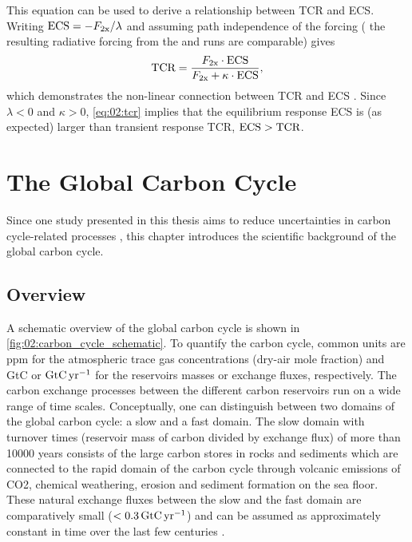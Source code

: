 This equation can be used to derive a relationship between \ac{TCR} and
\ac{ECS}. Writing $\mathtxt{ECS} = -F_\mathtxt{2x} / \lambda$ and assuming path
independence of the forcing (\ie{} the resulting radiative forcing from the
\onepctcotwo{} and  runs are comparable) gives
\begin{equation}
  \mathtxt{TCR} = \frac{F_\mathtxt{2x} \cdot \mathtxt{ECS}}{F_\mathtxt{2x} +
    \kappa \cdot \mathtxt{ECS}},
  \label{eq:02:tcr_vs_ecs}
\end{equation}
which demonstrates the non-linear connection between \ac{TCR} and \ac{ECS}
\autocite{Gregory2008, Nijsse2020}. Since $\lambda < 0$ and $\kappa > 0$,
\cref{eq:02:tcr} implies that the equilibrium response \ac{ECS} is (as
expected) larger than transient response \ac{TCR}, \ie{} $\mathtxt{ECS} >
\mathtxt{TCR}$.


\section{The Global Carbon Cycle}
\label{sec:02:carbon_cycle}

Since one study presented in this thesis aims to reduce uncertainties in carbon
cycle-related processes ,
this chapter introduces the scientific background of the global carbon cycle.


\subsection{Overview}
\label{subsec:02:carbon_cycle_overview}

A schematic overview of the global carbon cycle is shown in
\cref{fig:02:carbon_cycle_schematic}. To quantify the carbon cycle, common
units are \ac{ppm} for the atmospheric trace gas concentrations (dry-air mole
fraction) and \ac{GtC} or $\si{\GtCyr{}}$ for the reservoirs masses or exchange
fluxes, respectively. The carbon exchange processes between the different
carbon reservoirs run on a wide range of time scales. Conceptually, one can
distinguish between two domains of the global carbon cycle: a slow and a fast
domain. The slow domain with turnover times (reservoir mass of carbon divided
by exchange flux) of more than 10000 years consists of the large carbon stores
in rocks and sediments which are connected to the rapid domain of the carbon
cycle through volcanic emissions of \ac{CO2}, chemical weathering, erosion and
sediment formation on the sea floor. These natural exchange fluxes between the
slow and the fast domain are comparatively small ($< 0.3 \unit{\GtCyr{}}$) and
can be assumed as approximately constant in time over the last few centuries
\autocite{Ciais2013}.

